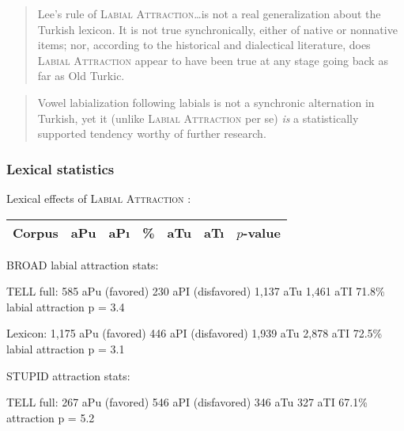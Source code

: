 \begin{quotation}
Lee's rule of \textsc{Labial Attraction}\ldots is not a real generalization about the Turkish lexicon. It is not true synchronically, either of native or nonnative items; nor, according to the historical and dialectical literature, does \textsc{Labial Attraction} appear to have been true at any stage going back as far as Old Turkic. \citep[][196]{Inkelas2001}
\end{quotation}

\begin{quotation}
Vowel labialization following labials is not a synchronic alternation in Turkish, yet it (unlike \textsc{Labial Attraction} per se) \emph{is} a statistically supported tendency worthy of further research. \citep[][196, emphasis in original]{Inkelas2001}
\end{quotation}

\citet{Inkelas1997}
\citet{Inkelas2001}
\citet{TELL}

\subsubsection{Lexical statistics}


\ex Lexical effects of \textsc{Labial Attraction} \citep[][186]{Inkelas2001}: \vspace{6pt} \\
\begin{tabular}{l r r r | r r r}
\toprule
Corpus  & aPu & aPı & \% & aTu & aTı & $p$-value   \\ %
\midrule
\bottomrule
\end{tabular} \xe


BROAD labial attraction stats:

TELL full:
585 aPu (favored)
230 aPI (disfavored)
1,137 aTu
1,461 aTI
71.8\% labial attraction
p = 3.4

Lexicon:
1,175 aPu (favored)
446 aPI (disfavored)
1,939 aTu
2,878 aTI
72.5\% labial attraction
p = 3.1

STUPID attraction stats:

TELL full:
267 aPu (favored)
546 aPI (disfavored)
346 aTu
327 aTI
67.1\% attraction
p = 5.2

